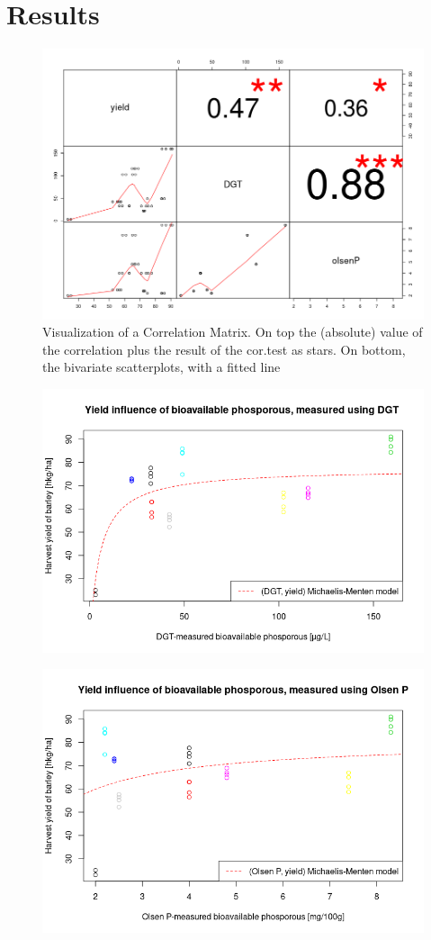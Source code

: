 \documentclass[12pt,fleqn]{article}
\begin{document}
\section{Results}
\begin{figure}[H]
	\centering
	\includegraphics[width=.9\linewidth]{p2_corrplot}
	\caption{Visualization of a Correlation Matrix. On top the (absolute) value of the correlation plus the result of the cor.test as stars. On bottom, the bivariate scatterplots, with a fitted line}
\end{figure}
\begin{figure}[H]
	\centering
	\includegraphics[width=.8\linewidth]{dgt_mmm}
\end{figure}
\begin{figure}[H]
	\centering
	\includegraphics[width=.8\linewidth]{oP_mm}
\end{figure}
\end{document}

